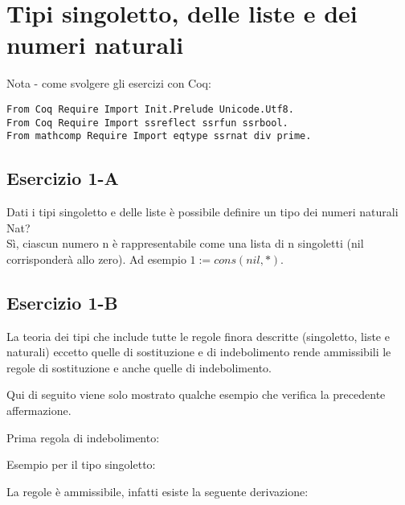 \newpage
\section{Tipi singoletto, delle liste e dei numeri naturali}

Nota - come svolgere gli esercizi con Coq:

\begin{lstlisting}[language=Coq]
From Coq Require Import Init.Prelude Unicode.Utf8.
From Coq Require Import ssreflect ssrfun ssrbool.
From mathcomp Require Import eqtype ssrnat div prime.
\end{lstlisting}

\subsection{Esercizio 1-A}

Dati i tipi singoletto e delle liste è possibile definire un tipo dei numeri 
naturali Nat? \\

Sì, ciascun numero n è rappresentabile come una lista di n singoletti (nil
corrisponderà allo zero). Ad esempio $1 := cons(nil, *)$.

\subsection{Esercizio 1-B}

La teoria dei tipi che include tutte le regole finora descritte (singoletto,
liste e naturali) eccetto quelle di sostituzione e di indebolimento rende
ammissibili le regole di sostituzione e anche quelle di indebolimento.

Qui di seguito viene solo mostrato qualche esempio che verifica la precedente
affermazione.

Prima regola di indebolimento:

\begin{prooftree}
\end{prooftree}

Esempio per il tipo singoletto:

\begin{prooftree}
\end{prooftree}

La regole è ammissibile, infatti esiste la seguente derivazione:

